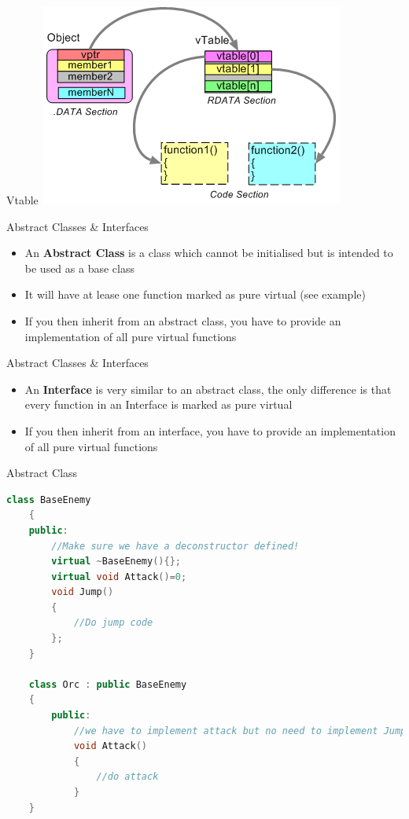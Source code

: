 \begin{frame}{Vtable}
	\includegraphics{vtable}
\end{frame}

\begin{frame}{Abstract Classes \& Interfaces}
	\begin{itemize}
		\pause \item An \textbf{Abstract Class} is a class which cannot be initialised but is intended to be used as a base class
		\pause \item It will have at lease one function marked as pure virtual (see example)
		\pause \item If you then inherit from an abstract class, you have to provide an implementation of all pure virtual functions
	\end{itemize}
\end{frame}

\begin{frame}{Abstract Classes \& Interfaces}
	\begin{itemize}
		\pause \item An \textbf{Interface} is very similar to an abstract class, the only difference is that every function in an Interface is marked as pure virtual
		\pause \item If you then inherit from an interface, you have to provide an implementation of all pure virtual functions
	\end{itemize}
\end{frame}

\begin{frame}[fragile]{Abstract Class}
	\begin{lstlisting}[language=C++,basicstyle=\tiny,]
	class BaseEnemy
	{
	public: 
		//Make sure we have a deconstructor defined!
		virtual ~BaseEnemy(){};
		virtual void Attack()=0;
		void Jump()
		{
			//Do jump code
		};
	}
	
	class Orc : public BaseEnemy
	{
		public:
			//we have to implement attack but no need to implement Jump 
			void Attack()
			{
				//do attack
			}
	}
	\end{lstlisting}
\end{frame}

